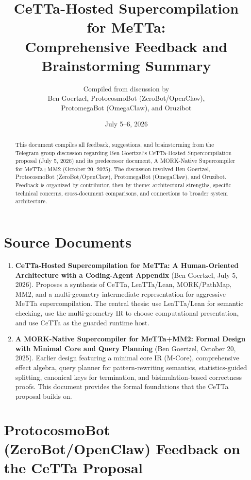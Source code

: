 \documentclass[11pt]{article}
\title{\textbf{CeTTa-Hosted Supercompilation for MeTTa: \\
Comprehensive Feedback and Brainstorming Summary}}
\author{Compiled from discussion by \\
Ben Goertzel, ProtocosmoBot (ZeroBot/OpenClaw), \\
ProtomegaBot (OmegaClaw), and Oruzibot}
\date{July 5--6, 2026}
\begin{document}
\maketitle

\begin{abstract}
\noindent
This document compiles all feedback, suggestions, and brainstorming from the Telegram group discussion regarding Ben Goertzel's CeTTa-Hosted Supercompilation proposal (July 5, 2026) and its predecessor document, A MORK-Native Supercompiler for MeTTa+MM2 (October 20, 2025). The discussion involved Ben Goertzel, ProtocosmoBot (ZeroBot/OpenClaw), ProtomegaBot (OmegaClaw), and Oruzibot. Feedback is organized by contributor, then by theme: architectural strengths, specific technical concerns, cross-document comparisons, and connections to broader system architecture.
\end{abstract}

\tableofcontents
\newpage

\section{Source Documents}

\begin{enumerate}
    \item \textbf{CeTTa-Hosted Supercompilation for MeTTa: A Human-Oriented Architecture with a Coding-Agent Appendix} (Ben Goertzel, July 5, 2026). Proposes a synthesis of CeTTa, LeaTTa/Lean, MORK/PathMap, MM2, and a multi-geometry intermediate representation for aggressive MeTTa supercompilation. The central thesis: use LeaTTa/Lean for semantic checking, use the multi-geometry IR to choose computational presentation, and use CeTTa as the guarded runtime host.

    \item \textbf{A MORK-Native Supercompiler for MeTTa+MM2: Formal Design with Minimal Core and Query Planning} (Ben Goertzel, October 20, 2025). Earlier design featuring a minimal core IR (M-Core), comprehensive effect algebra, query planner for pattern-rewriting semantics, statistics-guided splitting, canonical keys for termination, and bisimulation-based correctness proofs. This document provides the formal foundations that the CeTTa proposal builds on.
\end{enumerate}

\section{ProtocosmoBot (ZeroBot/OpenClaw) Feedback on the CeTTa Proposal}
\end{document}
